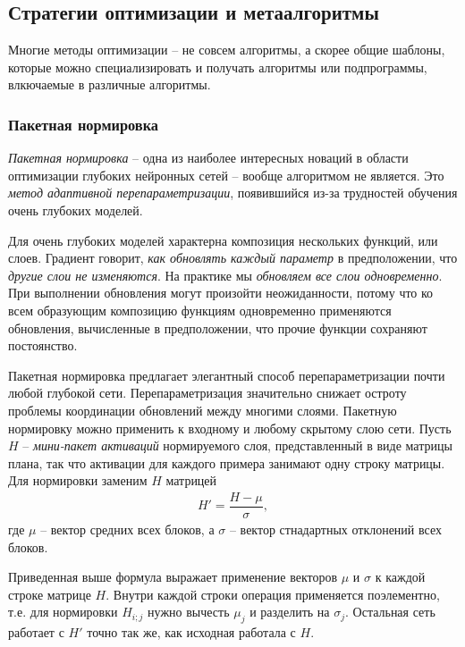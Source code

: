 \documentclass[%
	11pt,
	a4paper,
	utf8,
]{article}
\begin{document}
\subsection{Стратегии оптимизации и метаалгоритмы}

Многие методы оптимизации -- не совсем алгоритмы, а скорее общие шаблоны, которые можно специализировать и получать алгоритмы или подпрограммы, влкючаемые в различные алгоритмы.

\subsubsection{Пакетная нормировка}

\emph{Пакетная нормировка} -- одна из наиболее интересных новаций в области оптимизации глубоких нейронных сетей -- вообще алгоритмом не является. Это \emph{метод адаптивной перепараметризации}, появившийся из-за трудностей обучения очень глубоких моделей.

Для очень глубоких моделей характерна композиция нескольких функций, или слоев. Градиент говорит, \emph{как обновлять каждый параметр} в предположении, что \emph{другие слои не изменяются}. На практике мы \emph{обновляем все слои одновременно}. При выполнении обновления могут произойти неожиданности, потому что ко всем образующим композицию функциям одновременно применяются обновления, вычисленные в предположении, что прочие функции сохраняют постоянство.

Пакетная нормировка предлагает элегантный способ перепараметризации почти любой глубокой сети. Перепараметризация значительно снижает остроту проблемы координации обновлений между многими слоями. Пакетную нормировку можно применить к входному и любому скрытому слою сети. Пусть $ H $ -- \emph{мини-пакет активаций} нормируемого слоя, представленный в виде матрицы плана, так что активации для каждого примера занимают одну строку матрицы. Для нормировки заменим $ H $ матрицей
\begin{align*}
	H' = \dfrac{H - \mu}{{\sigma}},
\end{align*}
где $ \mu $ -- вектор средних всех блоков, а $ \sigma $ -- вектор стнадартных отклонений всех блоков.

Приведенная выше формула выражает применение векторов $ \mu $ и $ \sigma $ к каждой строке матрице $ H $. Внутри каждой строки операция применяется поэлементно, т.е. для нормировки $ H_{i;j} $ нужно вычесть $ \mu_j $ и разделить на $ \sigma_j $. Остальная сеть работает с $ H' $ точно так же, как исходная работала с $ H $.
\end{document}
